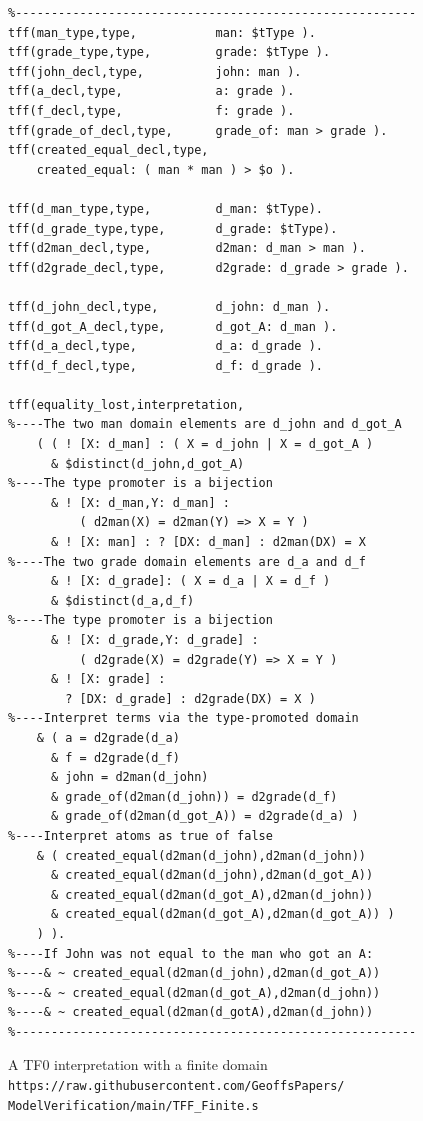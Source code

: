 \documentclass[letterpaper]{article}
\begin{document}
\begin{figure}[htbp]
\scriptsize
{}
\begin{verbatim}
%--------------------------------------------------------
tff(man_type,type,           man: $tType ).
tff(grade_type,type,         grade: $tType ).
tff(john_decl,type,          john: man ).
tff(a_decl,type,             a: grade ).
tff(f_decl,type,             f: grade ).
tff(grade_of_decl,type,      grade_of: man > grade ).
tff(created_equal_decl,type, 
    created_equal: ( man * man ) > $o ).

tff(d_man_type,type,         d_man: $tType).
tff(d_grade_type,type,       d_grade: $tType).
tff(d2man_decl,type,         d2man: d_man > man ).
tff(d2grade_decl,type,       d2grade: d_grade > grade ).

tff(d_john_decl,type,        d_john: d_man ).
tff(d_got_A_decl,type,       d_got_A: d_man ).
tff(d_a_decl,type,           d_a: d_grade ).
tff(d_f_decl,type,           d_f: d_grade ).

tff(equality_lost,interpretation,
%----The two man domain elements are d_john and d_got_A
    ( ( ! [X: d_man] : ( X = d_john | X = d_got_A )
      & $distinct(d_john,d_got_A)
%----The type promoter is a bijection
      & ! [X: d_man,Y: d_man] : 
          ( d2man(X) = d2man(Y) => X = Y )
      & ! [X: man] : ? [DX: d_man] : d2man(DX) = X
%----The two grade domain elements are d_a and d_f
      & ! [X: d_grade]: ( X = d_a | X = d_f )
      & $distinct(d_a,d_f)
%----The type promoter is a bijection
      & ! [X: d_grade,Y: d_grade] : 
          ( d2grade(X) = d2grade(Y) => X = Y )
      & ! [X: grade] : 
        ? [DX: d_grade] : d2grade(DX) = X )
%----Interpret terms via the type-promoted domain 
    & ( a = d2grade(d_a)
      & f = d2grade(d_f)
      & john = d2man(d_john)
      & grade_of(d2man(d_john)) = d2grade(d_f)
      & grade_of(d2man(d_got_A)) = d2grade(d_a) )
%----Interpret atoms as true of false
    & ( created_equal(d2man(d_john),d2man(d_john))
      & created_equal(d2man(d_john),d2man(d_got_A))
      & created_equal(d2man(d_got_A),d2man(d_john))
      & created_equal(d2man(d_got_A),d2man(d_got_A)) ) 
    ) ).
%----If John was not equal to the man who got an A:
%----& ~ created_equal(d2man(d_john),d2man(d_got_A))
%----& ~ created_equal(d2man(d_got_A),d2man(d_john))
%----& ~ created_equal(d2man(d_gotA),d2man(d_john))
%--------------------------------------------------------
\end{verbatim}
\caption{A TF0 interpretation with a finite domain \\
{\scriptsize {\tt https://raw.githubusercontent.com/GeoffsPapers/\\
ModelVerification/main/TFF\_Finite.s}}}
\label{TF0FiniteInterpretation}
\end{figure}
\end{document}

